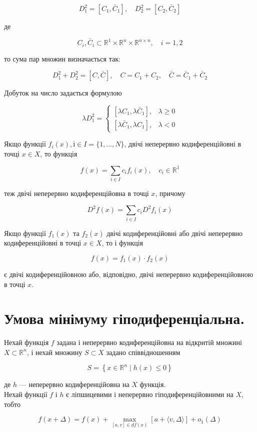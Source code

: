 \documentclass[12pt,a4paper]{extarticle}
\numberwithin{section}{part}
\begin{document}
$$
D_{1}^{2}=\left[C_{1}, \bar{C}_{1}\right], \quad D_{2}^{2}=\left[C_{2}, \bar{C}_{2}\right]
$$

де

$$
C_{i}, \bar{C}_{i} \subset \mathbb{R}^{1} \times \mathbb{R}^{n} \times \mathbb{R}^{n \times n}, \quad i=1,2
$$

то сума пар множин визначається так:

$$
D_{1}^{2}+D_{2}^{2}=[C, \bar{C}], \quad C=C_{1}+C_{2}, \quad \bar{C}=\bar{C}_{1}+\bar{C}_{2}
$$

Добуток на число задається формулою

$$
\lambda D_{1}^{2}= \begin{cases}{\left[\lambda C_{1}, \lambda \bar{C}_{1}\right],} & \lambda \geq 0 \\ {\left[\lambda \bar{C}_{1}, \lambda C_{1}\right],} & \lambda<0\end{cases}
$$

Якщо функції $f_{i}(x), і \in I=\{1, \ldots, N\}$, двічі неперервно кодиференційовні в точці $x \in X$, то функція

$$
f(x)=\sum_{i \in I} c_{i} f_{i}(x), \quad c_{i} \in \mathbb{R}^{1}
$$

теж двічі неперервно кодиференційовна в точці $x$, причому

$$
D^{2} f(x)=\sum_{i \in I} c_{i} D^{2} f_{i}(x)
$$

Якщо функції $f_{1}(x)$ та $f_{2}(x)$ двічі кодиференційовні або двічі неперервно кодиференційовні в точці $x \in X$, то і функція

$$
f(x)=f_{1}(x) \cdot f_{2}(x)
$$

є двічі кодиференційовною або, відповідно, двічі неперервно кодиференційовною в точці $x$.

\section{Умова мінімуму гіподиференціальна.}
Нехай функція $f$ задана і неперервно кодиференційовна на відкритій множині $X \subset \mathbb{R}^{n}$, і нехай множину $S \subset X$ задано співвідношенням

$$
S=\left\{x \in \mathbb{R}^{n} \mid h(x) \leq 0\right\}
$$

де $h$ --- неперервно кодиференційовна на $X$ функція.\\
Нехай функції $f$ і $h$ є ліпшицевими і неперервно гіподиференційовними на $X$, тобто

$$
f(x+\Delta)=f(x)+\max _{[a, v] \in \underline{d} f(x)}[a+\langle v, \Delta\rangle]+o_{1}(\Delta)
$$
\end{document}

